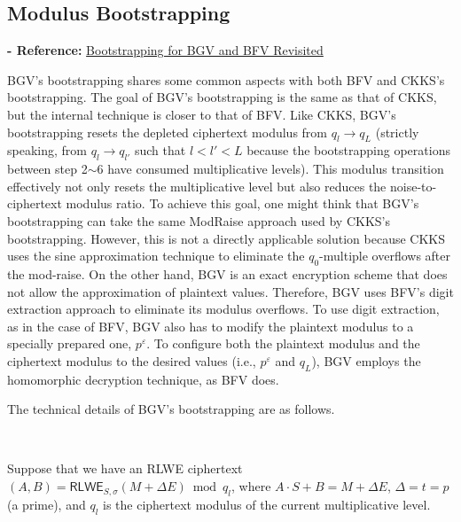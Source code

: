 \subsection{Modulus Bootstrapping}
\label{subsec:bgv-bootstrapping}

\noindent \textbf{- Reference:} 
\href{https://eprint.iacr.org/2022/1363.pdf}{Bootstrapping for BGV and BFV Revisited}~\cite{cryptoeprint:2022/1363}

BGV's bootstrapping shares some common aspects with both BFV and CKKS's bootstrapping. The goal of BGV's bootstrapping is the same as that of CKKS, but the internal technique is closer to that of BFV. Like CKKS, BGV's bootstrapping resets the depleted ciphertext modulus from $q_l \rightarrow q_L$ (strictly speaking, from $q_l \rightarrow q_{l'}$ such that $l < l' < L$ because the bootstrapping operations between step 2$\sim$6 have consumed multiplicative levels). This modulus transition effectively not only resets the multiplicative level but also reduces the noise-to-ciphertext modulus ratio. To achieve this goal, one might think that BGV's bootstrapping can take the same \textsf{ModRaise} approach used by CKKS's bootstrapping. However, this is not a directly applicable solution because CKKS uses the sine approximation technique to eliminate the $q_0$-multiple overflows after the mod-raise. On the other hand, BGV is an exact encryption scheme that does not allow the approximation of plaintext values. Therefore, BGV uses BFV's digit extraction approach to eliminate its modulus overflows. To use digit extraction, as in the case of BFV, BGV also has to modify the plaintext modulus to a specially prepared one, $p^\varepsilon$. To configure both the plaintext modulus and the ciphertext modulus to the desired values (i.e., $p^\varepsilon$ and $q_L$), BGV employs the homomorphic decryption technique, as BFV does.  


The technical details of BGV's bootstrapping are as follows. 

$ $

Suppose that we have an RLWE ciphertext $(A, B)  = \textsf{RLWE}_{S, \sigma}(M + \Delta E) \bmod q_l$, where $A\cdot S + B = M + \Delta E$, \text{ } $\Delta = t = p$ (a prime), and $q_l$ is the ciphertext modulus of the current multiplicative level. 

$ $

